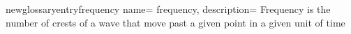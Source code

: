 newglossaryentry{frequency}
 {
    name= frequency,
    description= {Frequency is the number of crests of a wave that move past a given point in a given unit of time}
}
